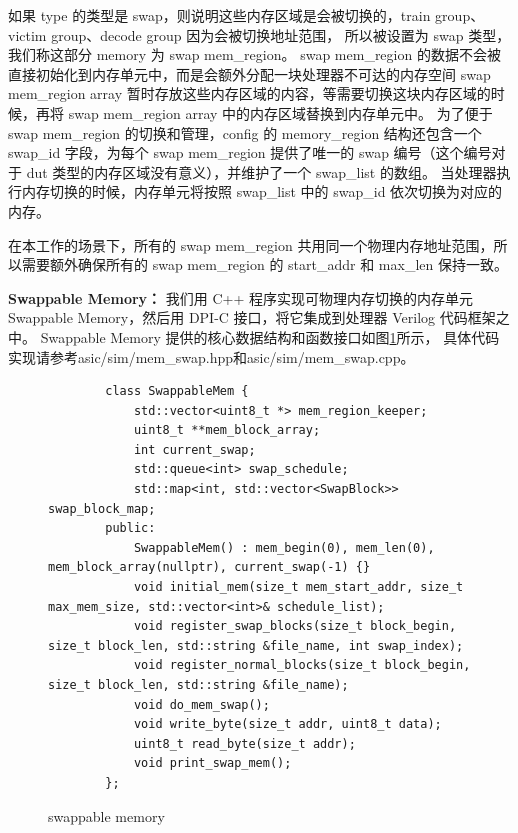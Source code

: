 如果 type 的类型是 swap，则说明这些内存区域是会被切换的，train group、victim group、decode group 因为会被切换地址范围，
所以被设置为 swap 类型，我们称这部分 memory 为 swap mem\_region。
swap mem\_region 的数据不会被直接初始化到内存单元中，而是会额外分配一块处理器不可达的内存空间 swap mem\_region array 
暂时存放这些内存区域的内容，等需要切换这块内存区域的时候，再将 swap mem\_region array 中的内存区域替换到内存单元中。
为了便于 swap mem\_region 的切换和管理，config 的 memory\_region 结构还包含一个 swap\_id 字段，为每个 swap mem\_region
提供了唯一的 swap 编号（这个编号对于 dut 类型的内存区域没有意义），并维护了一个 swap\_list 的数组。
当处理器执行内存切换的时候，内存单元将按照 swap\_list 中的 swap\_id 依次切换为对应的内存。\par 

在本工作的场景下，所有的 swap mem\_region 共用同一个物理内存地址范围，所以需要额外确保所有的 swap mem\_region 的 start\_addr
和 max\_len 保持一致。\par

\textbf{Swappable Memory：}
我们用 C++ 程序实现可物理内存切换的内存单元 Swappable Memory，然后用 DPI-C 接口，将它集成到处理器 Verilog 代码框架之中。
Swappable Memory 提供的核心数据结构和函数接口如图\ref{code:swappable-memory}所示，
具体代码实现请参考asic/sim/mem\_swap.hpp和asic/sim/mem\_swap.cpp。\par

\begin{figure}[htbp]
    \centering
    \begin{verbatim}
        class SwappableMem {
            std::vector<uint8_t *> mem_region_keeper;
            uint8_t **mem_block_array;
            int current_swap;
            std::queue<int> swap_schedule;
            std::map<int, std::vector<SwapBlock>> swap_block_map;
        public:
            SwappableMem() : mem_begin(0), mem_len(0), mem_block_array(nullptr), current_swap(-1) {}
            void initial_mem(size_t mem_start_addr, size_t max_mem_size, std::vector<int>& schedule_list);
            void register_swap_blocks(size_t block_begin, size_t block_len, std::string &file_name, int swap_index);
            void register_normal_blocks(size_t block_begin, size_t block_len, std::string &file_name);
            void do_mem_swap();
            void write_byte(size_t addr, uint8_t data);
            uint8_t read_byte(size_t addr);
            void print_swap_mem();
        };
    \end{verbatim}
    \caption{swappable memory}
    \label{code:swappable-memory}
\end{figure}

